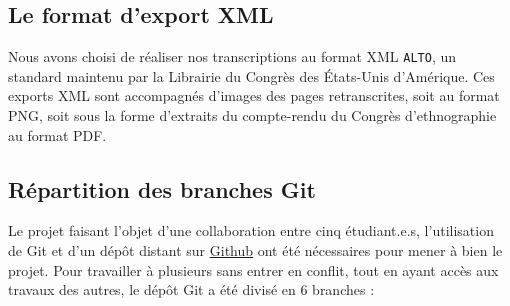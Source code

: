 \documentclass{article}
\begin{document}
	
	\subsection{Le format d'export XML}
	
	Nous avons choisi de réaliser nos transcriptions au format XML \texttt{ALTO}, un standard maintenu par la Librairie du Congrès des États-Unis d'Amérique. Ces exports XML sont accompagnés d'images des pages retranscrites, soit au format PNG, soit sous la forme d'extraits du compte-rendu du Congrès d'ethnographie au format PDF.
 	
	\subsection{Répartition des branches Git}
	
	Le projet faisant l'objet d'une collaboration entre cinq étudiant.e.s, l'utilisation de Git et d'un dépôt distant sur \href{https://github.com/kat-kel/TNAH-2021-Expositions_Universelles/}{Github} ont été nécessaires pour mener à bien le projet. Pour travailler à plusieurs sans entrer en conflit, tout en ayant accès aux travaux des autres, le dépôt Git a été divisé en 6 branches :
	
\end{document}
